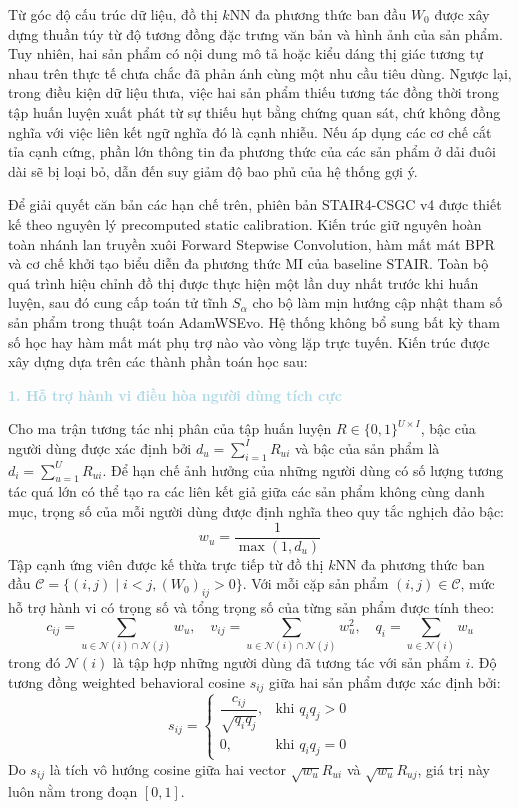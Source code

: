 Từ góc độ cấu trúc dữ liệu, đồ thị $k\text{NN}$ đa phương thức ban đầu $W_0$ được xây dựng thuần túy từ độ tương đồng đặc trưng văn bản và hình ảnh của sản phẩm. Tuy nhiên, hai sản phẩm có nội dung mô tả hoặc kiểu dáng thị giác tương tự nhau trên thực tế chưa chắc đã phản ánh cùng một nhu cầu tiêu dùng. Ngược lại, trong điều kiện dữ liệu thưa, việc hai sản phẩm thiếu tương tác đồng thời trong tập huấn luyện xuất phát từ sự thiếu hụt bằng chứng quan sát, chứ không đồng nghĩa với việc liên kết ngữ nghĩa đó là cạnh nhiễu. Nếu áp dụng các cơ chế cắt tỉa cạnh cứng, phần lớn thông tin đa phương thức của các sản phẩm ở dải đuôi dài sẽ bị loại bỏ, dẫn đến suy giảm độ bao phủ của hệ thống gợi ý.

Để giải quyết căn bản các hạn chế trên, phiên bản STAIR4-CSGC v4 được thiết kế theo nguyên lý precomputed static calibration. Kiến trúc giữ nguyên hoàn toàn nhánh lan truyền xuôi Forward Stepwise Convolution, hàm mất mát BPR và cơ chế khởi tạo biểu diễn đa phương thức MI của baseline STAIR. Toàn bộ quá trình hiệu chỉnh đồ thị được thực hiện một lần duy nhất trước khi huấn luyện, sau đó cung cấp toán tử tĩnh $S_\alpha$ cho bộ làm mịn hướng cập nhật tham số sản phẩm trong thuật toán AdamWSEvo. Hệ thống không bổ sung bất kỳ tham số học hay hàm mất mát phụ trợ nào vào vòng lặp trực tuyến. Kiến trúc được xây dựng dựa trên các thành phần toán học sau:

\noindent\textcolor{lightblue}{\textbf{1. Hỗ trợ hành vi điều hòa người dùng tích cực}}

Cho ma trận tương tác nhị phân của tập huấn luyện $R \in \{0, 1\}^{U \times I}$, bậc của người dùng được xác định bởi $d_u = \sum_{i=1}^I R_{ui}$ và bậc của sản phẩm là $d_i = \sum_{u=1}^U R_{ui}$. Để hạn chế ảnh hưởng của những người dùng có số lượng tương tác quá lớn có thể tạo ra các liên kết giả giữa các sản phẩm không cùng danh mục, trọng số của mỗi người dùng được định nghĩa theo quy tắc nghịch đảo bậc:
\begin{equation}
w_u = \frac{1}{\max(1, d_u)}
\end{equation}
Tập cạnh ứng viên được kế thừa trực tiếp từ đồ thị $k\text{NN}$ đa phương thức ban đầu $\mathcal{C} = \{(i, j) \mid i < j, (W_0)_{ij} > 0\}$. Với mỗi cặp sản phẩm $(i, j) \in \mathcal{C}$, mức hỗ trợ hành vi có trọng số và tổng trọng số của từng sản phẩm được tính theo:
\begin{equation}
c_{ij} = \sum_{u \in \mathcal{N}(i) \cap \mathcal{N}(j)} w_u, \quad v_{ij} = \sum_{u \in \mathcal{N}(i) \cap \mathcal{N}(j)} w_u^2, \quad q_i = \sum_{u \in \mathcal{N}(i)} w_u
\end{equation}
trong đó $\mathcal{N}(i)$ là tập hợp những người dùng đã tương tác với sản phẩm $i$. Độ tương đồng weighted behavioral cosine $s_{ij}$ giữa hai sản phẩm được xác định bởi:
\begin{equation}
s_{ij} = \begin{cases} 
\dfrac{c_{ij}}{\sqrt{q_i q_j}}, & \text{khi } q_i q_j > 0 \\[8pt] 
0, & \text{khi } q_i q_j = 0 
\end{cases}
\end{equation}
Do $s_{ij}$ là tích vô hướng cosine giữa hai vector $\sqrt{w_u} R_{ui}$ và $\sqrt{w_u} R_{uj}$, giá trị này luôn nằm trong đoạn $[0, 1]$.

